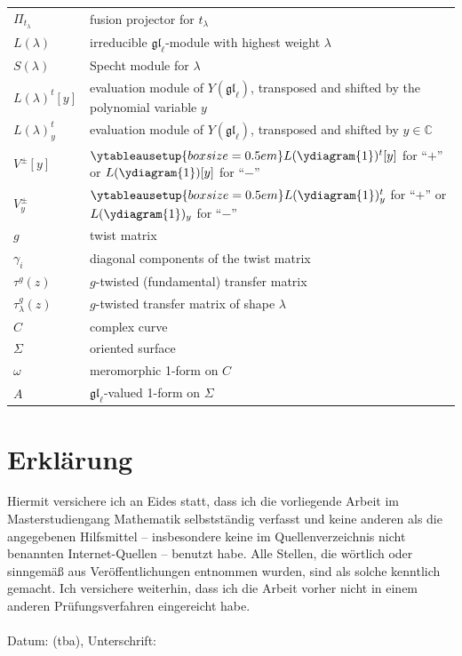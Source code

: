 \documentclass[11pt]{report}
\theoremstyle{definition}
\theoremstyle{remark}
\theoremstyle{remark}
\newcommand{\C}{\mathbb{C}}
\begin{document}
\begin{tabular}{l|l}
$\Pi_{t_\lambda}$ & fusion projector for $t_\lambda$ \\
$L(\lambda)$ & irreducible $\mathfrak{gl}_\ell$-module with highest weight $\lambda$ \\
$S(\lambda)$ & Specht module for $\lambda$ \\
$L(\lambda)^t[y]$ & evaluation module of $Y(\mathfrak{gl}_\ell)$, transposed and shifted by the polynomial variable $y$ \\
$L(\lambda)_y^t$ & evaluation module of $Y(\mathfrak{gl}_\ell)$, transposed and shifted by $y \in \C$ \\
$V^\pm[y]$ & $\ytableausetup{boxsize=0.5em}L(\ydiagram{1})^t[y]$ for “$+$” or $L(\ydiagram{1})[y]$ for “$-$” \\
$V_y^\pm$ & $\ytableausetup{boxsize=0.5em}L(\ydiagram{1})_y^t$ for “$+$” or $L(\ydiagram{1})_y$ for “$-$” \\
$g$ & twist matrix \\
$\gamma_i$ & diagonal components of the twist matrix \\
$\tau^g(z)$ & $g$-twisted (fundamental) transfer matrix \\
$\tau_\lambda^g(z)$ & $g$-twisted transfer matrix of shape $\lambda$ \\
$C$ & complex curve \\
$\Sigma$ & oriented surface \\
$\omega$ & meromorphic 1-form on $C$ \\
$A$ & $\mathfrak{gl}_\ell$-valued 1-form on $\Sigma$
\end{tabular}

\pagebreak

\printindex




\pagebreak

\section*{Erklärung}

Hiermit versichere ich an Eides statt, dass ich die vorliegende Arbeit im Masterstudiengang Mathematik selbstständig verfasst und keine anderen als die angegebenen Hilfsmittel – insbesondere keine im Quellenverzeichnis nicht benannten Internet-Quellen – benutzt habe. Alle Stellen, die wörtlich oder sinngemäß aus Veröffentlichungen entnommen wurden, sind als solche kenntlich gemacht. Ich versichere weiterhin, dass ich die Arbeit vorher nicht in einem anderen Prüfungsverfahren eingereicht habe.
~\\~\\
Datum: (tba), Unterschrift:

\end{document}
